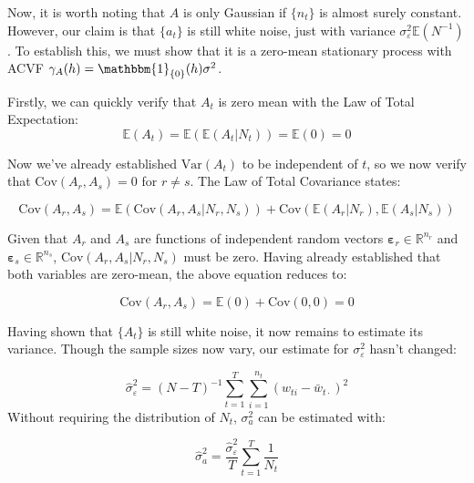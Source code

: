 \documentclass{TUT}
\numberwithin{equation}{section}
\theoremstyle{plain}
\begin{document}
Now, it is worth noting that $A$ is only Gaussian if $\{n_t\}$ is almost surely constant. However, our claim is that $\{a_t\}$ is still white noise, just with variance $\sigma_\varepsilon^2\mathbb{E}(N^{-1})$. To establish this, we must show that it is a zero-mean stationary process with ACVF $\gamma_A(h) = \mathbbm{1}_{\{0\}}(h)\sigma^2$.

Firstly, we can quickly verify that $A_t$ is zero mean with the Law of Total Expectation:
$$ \mathbb{E}(A_t) = \mathbb{E}(\mathbb{E}(A_t|N_t)) = \mathbb{E}(0) = 0 $$

Now we've already established $\text{Var}(A_t)$ to be independent of $t$, so we now verify that $\text{Cov}(A_r,A_s) = 0$ for $r \neq s$. The Law of Total Covariance states:

$$ \text{Cov}(A_r,A_s) = \mathbb{E}(\text{Cov}(A_r,A_s|N_r,N_s)) + \text{Cov}(\mathbb{E}(A_r|N_r), \mathbb{E}(A_s|N_s))$$

Given that $A_r$ and $A_s$ are functions of independent random vectors $\bm{\varepsilon}_r \in \mathbb{R}^{n_r}$ and $\bm{\varepsilon}_s \in \mathbb{R}^{n_s}$, $\text{Cov}(A_r,A_s|N_r,N_s)$ must be zero. Having already established that both variables are zero-mean, the above equation reduces to:

$$ \text{Cov}(A_r,A_s) = \mathbb{E}(0) + \text{Cov}(0, 0) = 0$$

Having shown that $\{A_t\}$ is still white noise, it now remains to estimate its variance. Though the sample sizes now vary, our estimate for $\sigma_\varepsilon^2$ hasn't changed:

\begin{equation}
    \hat{\sigma}_\varepsilon^2 =(N-T)^{-1}\sum_{t=1}^T\sum_{i=1}^{n_t}(w_{ti}-\bar{w}_{t\cdot})^2 
    \label{eq:var_eps_hat}
\end{equation}
Without requiring the distribution of $N_t$, $\sigma_a^2$ can be estimated with:

\begin{equation}
    \label{eq:var_a_n}
    \hat{\sigma}_a^2 = \frac{\hat{\sigma}_\varepsilon^2}{T}\sum_{t=1}^T\frac{1}{N_t}
\end{equation}







\end{document}
